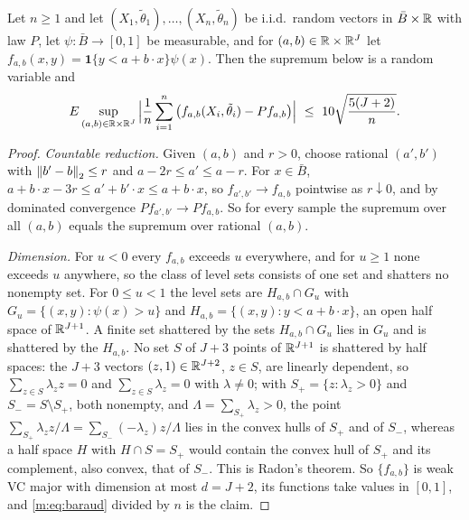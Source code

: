 \begin{lemma}\label{m:lem:qemp}
Let $n\ge1$ and let $(X_1,\tilde\theta_1),\dots,(X_n,\tilde\theta_n)$ be i.i.d.\ random vectors in $\bar B\times\mathbb{R}$ with law $P$, let $\psi:\bar B\to[0,1]$ be measurable, and for $(a,b)\in\mathbb{R}\times\mathbb{R}^J$ let $f_{a,b}(x,y)=\mathbf 1\{y<a+b\cdot x\}\psi(x)$. Then the supremum below is a random variable and
\[
E\sup_{(a,b)\in\R\times\R^J}\Big|\frac1n\sum_{i=1}^n\big(f_{a,b}(X_i,\tilde\theta_i)-Pf_{a,b}\big)\Big|\ \le\ 10\sqrt{\frac{5(J+2)}n} .
\]
\end{lemma}

\begin{proof}
\emph{Countable reduction.} Given $(a,b)$ and $r>0$, choose rational $(a',b')$ with $\left\|b'-b\right\|_2\le r$ and $a-2r\le a'\le a-r$. For $x\in\bar B$, $a+b\cdot x-3r\le a'+b'\cdot x\le a+b\cdot x$, so $f_{a',b'}\to f_{a,b}$ pointwise as $r\downarrow0$, and by dominated convergence $Pf_{a',b'}\to Pf_{a,b}$. So for every sample the supremum over all $(a,b)$ equals the supremum over rational $(a,b)$.

\emph{Dimension.} For $u<0$ every $f_{a,b}$ exceeds $u$ everywhere, and for $u\ge1$ none exceeds $u$ anywhere, so the class of level sets consists of one set and shatters no nonempty set. For $0\le u<1$ the level sets are $H_{a,b}\cap G_u$ with $G_u=\{(x,y):\psi(x)>u\}$ and $H_{a,b}=\{(x,y):y<a+b\cdot x\}$, an open half space of $\mathbb{R}^{J+1}$. A finite set shattered by the sets $H_{a,b}\cap G_u$ lies in $G_u$ and is shattered by the $H_{a,b}$. No set $S$ of $J+3$ points of $\mathbb{R}^{J+1}$ is shattered by half spaces: the $J+3$ vectors $(z,1)\in\mathbb{R}^{J+2}$, $z\in S$, are linearly dependent, so $\sum_{z\in S}\lambda_zz=0$ and $\sum_{z\in S}\lambda_z=0$ with $\lambda\ne0$; with $S_+=\{z:\lambda_z>0\}$ and $S_-=S\setminus S_+$, both nonempty, and $\Lambda=\sum_{S_+}\lambda_z>0$, the point $\sum_{S_+}\lambda_zz/\Lambda=\sum_{S_-}(-\lambda_z)z/\Lambda$ lies in the convex hulls of $S_+$ and of $S_-$, whereas a half space $H$ with $H\cap S=S_+$ would contain the convex hull of $S_+$ and its complement, also convex, that of $S_-$. This is Radon's theorem. So $\{f_{a,b}\}$ is weak VC major with dimension at most $d=J+2$, its functions take values in $[0,1]$, and \eqref{m:eq:baraud} divided by $n$ is the claim.
\end{proof}


